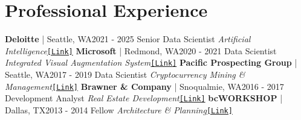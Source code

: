 \documentclass{article}
\begin{document}
\section*{Professional Experience}
        \textbf{Deloitte} | Seattle, WA\hfill{2021 - 2025}\newline
        Senior Data Scientist\newline
        \textit{Artificial Intelligence}\space\href{https://www.deloitte.com/us/en/services/consulting/services/artificial-intelligence-and-data.html}{\texttt{[Link]}}\newline\newline
        \textbf{Microsoft} | Redmond, WA\hfill{2020 - 2021}\newline
        Data Scientist\newline
        \textit{Integrated Visual Augmentation System}\space\href{https://news.microsoft.com/transform/u-s-army-to-use-hololens-technology-in-high-tech-headsets-for-soldiers/}{\texttt{[Link]}}\newline\newline
        \textbf{Pacific Prospecting Group} | Seattle, WA\hfill{2017 - 2019}\newline
        Data Scientist\newline
        \textit{Cryptocurrency Mining \& Management}\space\href{http://pacificprospectinggroup.com}{\texttt{[Link]}}\newline\newline
        \textbf{Brawner \& Company} | Snoqualmie, WA\hfill{2016 - 2017}\newline
        Development Analyst\newline
        \textit{Real Estate Development}\space\href{https://jhbrawner.com}{\texttt{[Link]}}\newline\newline
        \textbf{bcWORKSHOP} | Dallas, TX\hfill{2013 - 2014}\newline
        Fellow\newline
        \textit{Architecture \& Planning}\space\href{https://www.bcworkshop.org}{\texttt{[Link]}}
\end{document}
